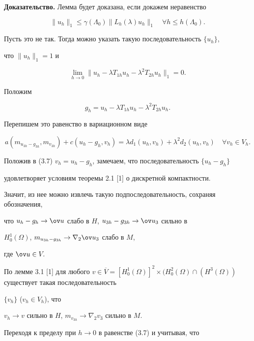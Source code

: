 {\bf Доказательство.} Лемма будет доказана, если докажем неравенство


$$


\|u_h\|_1\le \gamma(\Lambda_0)\|L_h(\lambda)u_h\|_1


\quad\forall h\le h(\Lambda_0).


$$


Пусть это не так. Тогда можно указать такую последовательность $\{u_h\}$,


что $\|u_h\|_1=1$ и


$$


\lim_{h\to 0}\|u_h-\lambda T_{1h}u_h-\lambda^2 T_{2h}u_h\|_1=0.


$$


Положим


$$


g_h=u_h-\lambda T_{1h}u_h-\lambda^2 T_{2h}u_h.


$$


Перепишем это равенство в вариационном виде


\begin{equation}


a(m_{u_{3h}-g_{3h}},m_{v_{3h}})+c(u_h-g_h,v_h)=\lambda d_1(u_h,v_h)+


{\lambda}^2 d_2(u_h,v_h)\quad \forall v_h \in V_h.


\end{equation}


Положив в (3.7) $v_h=u_h-g_h$, замечаем, что последовательность $\{u_h-g_h\}$


удовлетворяет условиям теоремы 2.1 [1] о дискретной компактности.


Значит, из нее можно извлечь такую подпоследовательность, сохраняя обозначения,


что $u_h-g_h\to \ov u$ слабо в $H$, $u_{3h}-g_{3h}\to \ov u_3$ сильно в


$H_0^1(\Omega)$, $m_{u_{3h}-g_{3h}} \to \nabla_2 \ov u_3$ слабо в $M$,


где $\ov u\in V.$


По лемме 3.1 [1] для любого $v \in \overline V=[H_0^1(\Omega)]^2


\times (H_0^2(\Omega)\cap (H^3(\Omega))$ существует такая последовательность


$\{v_h\}$ ($v_h\in V_h$), что


$v_h\to v$ сильно в $H$, $m_{v_{3h}} \to \nabla_2 v_3$ сильно в $M$.


Переходя к пределу при $h\to 0$ в равенстве (3.7) и учитывая, что


